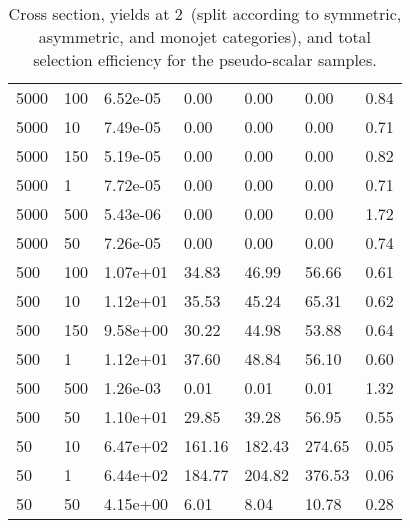 \begin{table}
\begin{tabular}{lllllll}
5000      &   100       &   6.52e-05  &   0.00      &   0.00      &   0.00      &   0.84      \\ 
5000      &   10        &   7.49e-05  &   0.00      &   0.00      &   0.00      &   0.71      \\ 
5000      &   150       &   5.19e-05  &   0.00      &   0.00      &   0.00      &   0.82      \\ 
5000      &   1         &   7.72e-05  &   0.00      &   0.00      &   0.00      &   0.71      \\ 
5000      &   500       &   5.43e-06  &   0.00      &   0.00      &   0.00      &   1.72      \\ 
5000      &   50        &   7.26e-05  &   0.00      &   0.00      &   0.00      &   0.74      \\ 
500       &   100       &   1.07e+01  &   34.83     &   46.99     &   56.66     &   0.61      \\ 
500       &   10        &   1.12e+01  &   35.53     &   45.24     &   65.31     &   0.62      \\ 
500       &   150       &   9.58e+00  &   30.22     &   44.98     &   53.88     &   0.64      \\ 
500       &   1         &   1.12e+01  &   37.60     &   48.84     &   56.10     &   0.60      \\ 
500       &   500       &   1.26e-03  &   0.01      &   0.01      &   0.01      &   1.32      \\ 
500       &   50        &   1.10e+01  &   29.85     &   39.28     &   56.95     &   0.55      \\ 
50        &   10        &   6.47e+02  &   161.16    &   182.43    &   274.65    &   0.05      \\ 
50        &   1         &   6.44e+02  &   184.77    &   204.82    &   376.53    &   0.06      \\ 
50        &   50        &   4.15e+00  &   6.01      &   8.04      &   10.78     &   0.28      \\ 
\hline
\end{tabular}
\caption{Cross section, yields at 2~\ifb (split according to symmetric, asymmetric, and monojet categories), and total selection efficiency for the pseudo-scalar \DMtt samples.}
\label{tab:dm_DMttP_g1_2fb}
\end{table}
